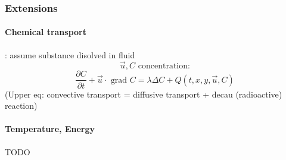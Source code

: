 \subsubsection{Extensions}
\paragraph{Chemical transport}: assume substance disolved in fluid
\[ \vec{u}, C \text{ concentration:} \]
\[ \frac{\partial C}{\partial t} + \vec{u} \cdot \text{ grad } C = \lambda \Delta C + Q(t,x,y,\vec{u},C) \]
(Upper eq: convective transport = diffusive transport + decau (radioactive) reaction)

\paragraph{Temperature, Energy}
TODO
